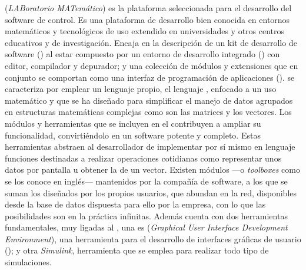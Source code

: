  (\emph{LABoratorio MATemático}) es la plataforma seleccionada
para el desarrollo del software de control. Es una plataforma de desarrollo
bien conocida en entornos matemáticos y tecnológicos de uso extendido en
universidades y otros centros educativos y de investigación. Encaja en la
descripción de un kit de desarrollo de software () al estar
compuesto por un entorno de desarrollo integrado () con editor,
compilador y depurador; y una colección de módulos y extensiones que en
conjunto se comportan como una interfaz de programación de aplicaciones
().  \matlab{} se caracteriza por emplear un lenguaje propio, el
lenguaje , enfocado a un uso matemático y que se ha diseñado para
simplificar el manejo de datos agrupados en estructuras matemáticas
complejas como son las matrices y los vectores. Los módulos y herramientas
que se incluyen en el  contribuyen a ampliar su funcionalidad,
convirtiéndolo en un software potente y completo. Estas herramientas
abstraen al desarrollador de implementar por sí mismo en lenguaje 
funciones destinadas a realizar operaciones cotidianas como representar
unos datos por pantalla u obtener la  de un vector. Existen
módulos ---o \emph{toolboxes} como se los conoce en inglés--- mantenidos
por la compañía de software, a los que se suman los diseñados por los
propios usuarios, que abundan en la red, disponibles desde la base de datos
dispuesta para ello por la empresa, con lo que las posibilidades son en la
práctica infinitas.  Además \matlab{} cuenta con dos herramientas
fundamentales, muy ligadas al , una es 
(\emph{Graphical User Interface Development Environment}), una herramienta
para el desarrollo de interfaces gráficas de usuario (); y otra
\emph{Simulink}, herramienta que se emplea para realizar todo tipo de
simulaciones.

